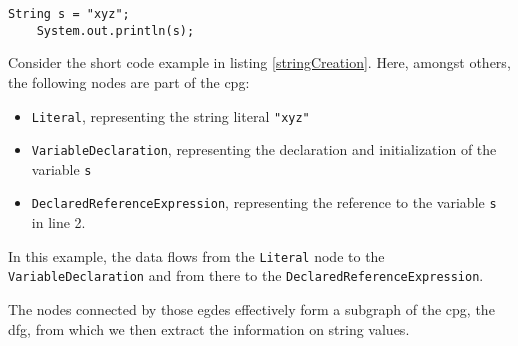 \begin{lstlisting}[label=stringCreation]
	String s = "xyz";
	System.out.println(s);
\end{lstlisting}

Consider the short code example in listing \ref{stringCreation}. Here, amongst others, the following nodes are part of the \ac{cpg}:

\begin{itemize}
	\item \lstinline{Literal}, representing the string literal \lstinline{"xyz"}
	\item \lstinline{VariableDeclaration}, representing the declaration and initialization of the variable \lstinline{s}
	\item \lstinline{DeclaredReferenceExpression}, representing the reference to the variable \lstinline{s} in line 2.
\end{itemize}

In this example, the data flows from the \lstinline{Literal} node to the \lstinline{VariableDeclaration} and from there to the \lstinline{DeclaredReferenceExpression}.

The nodes connected by those egdes effectively form a subgraph of the \ac{cpg}, the \ac{dfg}, from which we then extract the information on string values.

